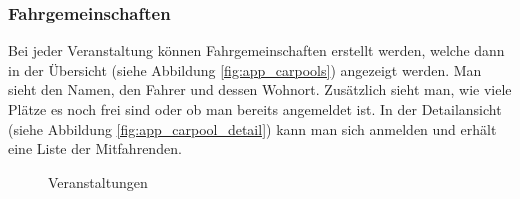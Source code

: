 \subsubsection{Fahrgemeinschaften}
Bei jeder Veranstaltung können Fahrgemeinschaften erstellt werden, welche dann in der Übersicht (siehe Abbildung \ref{fig:app_carpools}) angezeigt werden. Man sieht den Namen, den Fahrer und dessen Wohnort. Zusätzlich sieht man, wie viele Plätze es noch frei sind oder ob man bereits angemeldet ist. In der Detailansicht (siehe Abbildung \ref{fig:app_carpool_detail}) kann man sich anmelden und erhält eine Liste der Mitfahrenden.
\begin{figure}[ht]
\centering
{}
\label{fig:app_carpool_page}
\caption{Veranstaltungen}
\end{figure}

